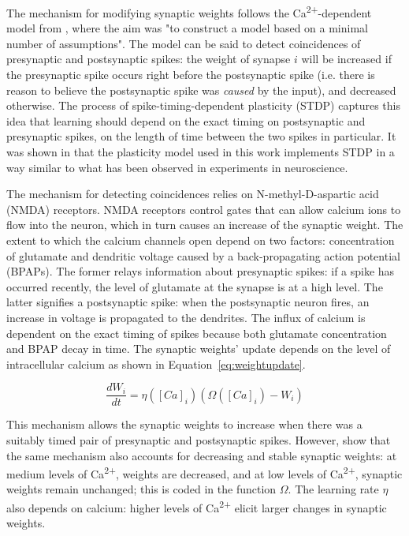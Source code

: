\documentclass[a4paper,12pt]{report}
\theoremstyle{definition}
\begin{document}
The mechanism for modifying synaptic weights follows the Ca\textsuperscript{2+}-dependent model from \cite{shouval2002unified}, where the aim was "to construct a model based on a minimal number of assumptions". The model can be said to detect coincidences of presynaptic and postsynaptic spikes: the weight of synapse $i$ will be increased if the presynaptic spike occurs right before the postsynaptic spike (i.e. there is reason to believe the postsynaptic spike was \emph{caused} by the input), and decreased otherwise. The process of spike-timing-dependent plasticity (STDP) captures this idea that learning should depend on the exact timing on postsynaptic and presynaptic spikes, on the length of time between the two spikes in particular. It was shown in \cite{shouval2002unified} that the plasticity model used in this work implements STDP in a way similar to what has been observed in experiments in neuroscience.


The mechanism for detecting coincidences relies on N-methyl-D-aspartic acid (NMDA) receptors. NMDA receptors control gates that can allow calcium ions to flow into the neuron, which in turn causes an increase of the synaptic weight. The extent to which the calcium channels open depend on two factors: concentration of glutamate and dendritic voltage caused by a back-propagating action potential (BPAPs). The former relays information about presynaptic spikes: if a spike has occurred recently, the level of glutamate at the synapse is at a high level. The latter signifies a postsynaptic spike: when the postsynaptic neuron fires, an increase in voltage is propagated to the dendrites. The influx of calcium is dependent on the exact timing of spikes because both glutamate concentration and BPAP decay in time. The synaptic weights' update depends on the level of intracellular calcium as shown in Equation~\ref{eq:weightupdate}.

\begin{equation}
\frac{dW_i}{dt} = \eta ([Ca]_i) (\Omega([Ca]_i) - W_i)
\label{eq:weightupdate}
\end{equation}

This mechanism allows the synaptic weights to increase when there was a suitably timed pair of presynaptic and postsynaptic spikes. However, \cite{shouval2002unified} show that the same mechanism also accounts for decreasing and stable synaptic weights: at medium levels of Ca\textsuperscript{2+}, weights are decreased, and at low levels of Ca\textsuperscript{2+}, synaptic weights remain unchanged; this is coded in the function $\Omega$. The learning rate $\eta$ also depends on calcium: higher levels of Ca\textsuperscript{2+} elicit larger changes in synaptic weights.
\end{document}
